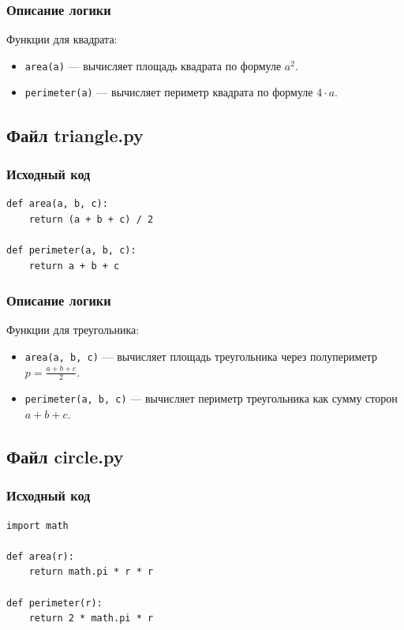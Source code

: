 \documentclass[a4paper,12pt]{article}
\begin{document}
\subsubsection{Описание логики}
Функции для квадрата:
\begin{itemize}
    \item \texttt{area(a)} — вычисляет площадь квадрата по формуле $a^2$.
    \item \texttt{perimeter(a)} — вычисляет периметр квадрата по формуле $4 \cdot a$.
\end{itemize}

\subsection{Файл triangle.py}
\subsubsection{Исходный код}
\begin{lstlisting}
def area(a, b, c):
    return (a + b + c) / 2

def perimeter(a, b, c):
    return a + b + c
\end{lstlisting}

\subsubsection{Описание логики}
Функции для треугольника:
\begin{itemize}
    \item \texttt{area(a, b, c)} — вычисляет площадь треугольника через полупериметр $p = \frac{a + b + c}{2}$.
    \item \texttt{perimeter(a, b, c)} — вычисляет периметр треугольника как сумму сторон $a + b + c$.
\end{itemize}

\subsection{Файл circle.py}
\subsubsection{Исходный код}
\begin{lstlisting}
import math

def area(r):
    return math.pi * r * r

def perimeter(r):
    return 2 * math.pi * r
\end{lstlisting}
\end{document}
